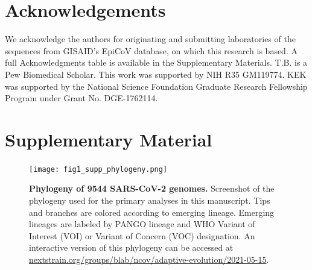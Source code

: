 \documentclass[11pt,oneside,letterpaper]{article}
\newcommand{\beginsupplement}{%
	\setcounter{figure}{0}
	\renewcommand{\thefigure}{S\arabic{figure}}%
}
\begin{document}
\section*{Acknowledgements}
\fussy
We acknowledge the authors for originating and submitting laboratories of the sequences from GISAID's EpiCoV database, on which this research is based.
A full Acknowledgments table is available in the Supplementary Materials.
T.B. is a Pew Biomedical Scholar.
This work was supported by NIH R35 GM119774.
KEK was supported by the National Science Foundation Graduate Research Fellowship Program under Grant No. DGE-1762114.

\small


\normalsize
\clearpage

\section*{Supplementary Material}
\beginsupplement

\begin{figure}[h!]
	\centerline{\texttt{[image: fig1\_supp\_phylogeny.png]}}
	\caption{\textbf{Phylogeny of 9544 SARS-CoV-2 genomes.}
	Screenshot of the phylogeny used for the primary analyses in this manuscript. Tips and branches are colored according to emerging lineage. Emerging lineages are labeled by PANGO lineage and WHO Variant of Interest (VOI) or Variant of Concern (VOC) designation. An interactive version of this phylogeny can be accessed at \href{https://nextstrain.org/groups/blab/ncov/adaptive-evolution/2021-05-15}{nextstrain.org/groups/blab/ncov/adaptive-evolution/2021-05-15}.
	}
	\label{fig:phylogeny}
\end{figure}
\end{document}
